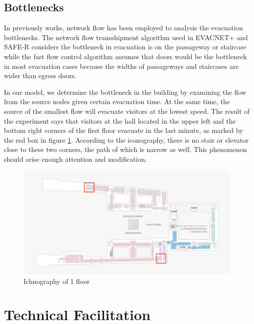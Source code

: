 \documentclass{mcmthesis}
\begin{document}
	\subsection{Bottlenecks}
	In previously works, network flow has been employed to analysis the evacuation bottlenecks. The network flow transshipment algorithm \cite{white1972dynamic} used in EVACNET+ and SAFE-R considers the bottleneck in evacuation is on the passageway or staircase while the fast flow control algorithm \cite{chen2009fast} assumes that doors would be the bottleneck in most evacuation cases because the widths of passageways and staircases are wider than egress doors. 
	
	In our model, we determine the bottleneck in the building by examining the flow from the source nodes given certain evacuation time. At the same time, the source of the smallest flow will evacuate visitors at the lowest speed.
	The result of the experiment says that visitors at the hall located in the upper left and the bottom right corners of the first floor evacuate in the last minute, as marked by the red box in figure \ref{fig:screenshot007}. According to the iconography, there is no stair or elevator close to these two corners, the path of which is narrow as well. This phenomenon should arise enough attention and modification.
	
	\begin{figure}
		\centering
		\includegraphics[width=0.7\linewidth]{../../Figure/screenshot007}
		\caption{Ichnography of 1 floor}
		\label{fig:screenshot007}
	\end{figure}
	
	
	\section{Technical Facilitation}
	
\end{document}
